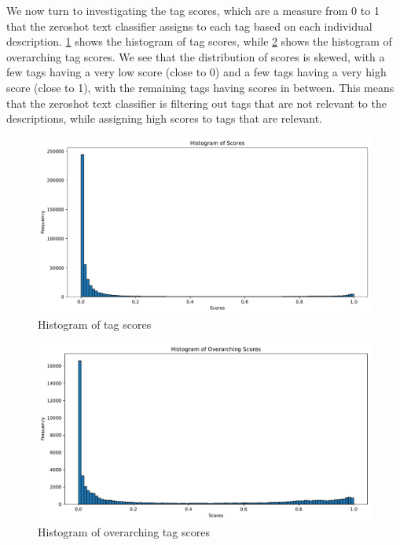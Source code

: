 We now turn to investigating the tag scores, which are a measure from 0 to 1 that the zeroshot text classifier assigns to each tag based on each individual description. \cref{fig:histogram_scores} shows the histogram of tag scores, while \cref{fig:histogram_overarching_scores} shows the histogram of overarching tag scores. We see that the distribution of scores is skewed, with a few tags having a very low score (close to 0) and a few tags having a very high score (close to 1), with the remaining tags having scores in between. This means that the zeroshot text classifier is filtering out tags that are not relevant to the descriptions, while assigning high scores to tags that are relevant.

\begin{figure}[h]
    \centering
    \includegraphics[width=\textwidth]{figures/histogram_scores.pdf}
    \caption{Histogram of tag scores}
    \label{fig:histogram_scores}
\end{figure}

\begin{figure}[h]
    \centering
    \includegraphics[width=\textwidth]{figures/histogram_overarching_scores.pdf}
    \caption{Histogram of overarching tag scores}
    \label{fig:histogram_overarching_scores}
\end{figure}

